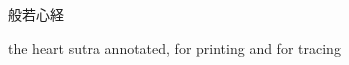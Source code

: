 \documentclass[letterpaper]{article}
\begin{document}
	\centering
	
	\vspace*{3cm}
	
	{
		\fontsize{70}{70}
		般若心経
	}

\vspace*{1cm}

	{
		\Large
		the heart sutra annotated, for printing and for tracing	

}



	
	




%
\end{document}
